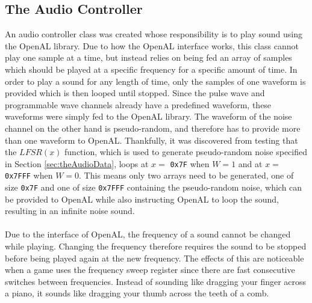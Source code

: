 \subsection{The Audio Controller}
An audio controller class was created whose responsibility is to play sound using the OpenAL library. Due to how the OpenAL interface works, this class cannot play one sample at a time, but instead relies on being fed an array of samples which should be played at a specific frequency for a specific amount of time. In order to play a sound for any length of time, only the samples of one waveform is provided which is then looped until stopped. Since the pulse wave and programmable wave channels already have a predefined waveform, these waveforms were simply fed to the OpenAL library. %
The waveform of the noise channel on the other hand is pseudo-random, and therefore has to provide more than one waveform to OpenAL.
Thankfully, it was discovered from testing that the $LFSR(x)$ function, which is used to generate pseudo-random noise specified in Section \ref{sec:theAudioData}, loops at $x = $ \texttt{0x7F} when $W = 1$ and at $x = $ \texttt{0x7FFF} when $W = 0$. This means only two arrays need to be generated, one of size \texttt{0x7F} and one of size \texttt{0x7FFF} containing the pseudo-random noise, which can be provided to OpenAL while also instructing OpenAL to loop the sound, resulting in an infinite noise sound.
\\\\
Due to the interface of OpenAL, the frequency of a sound cannot be changed while playing. Changing the frequency therefore requires the sound to be stopped before being played again at the new frequency. The effects of this are noticeable when a game uses the frequency sweep register since there are fast consecutive switches between frequencies. Instead of sounding like dragging your finger across a piano, it sounds like dragging your thumb across the teeth of a comb.
\newpage
